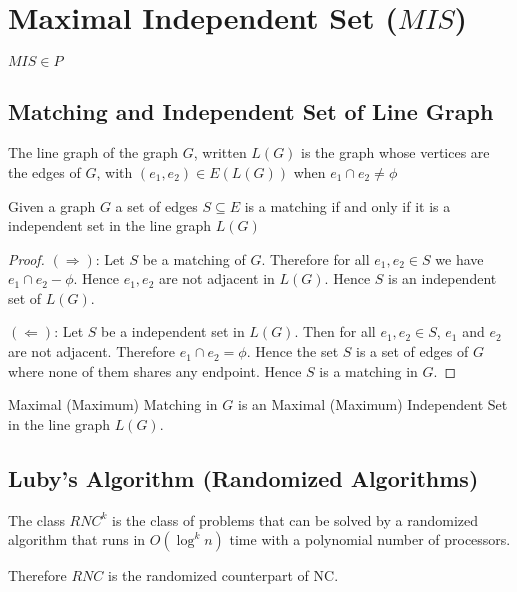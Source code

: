 \section{Maximal Independent Set ($MIS$)}
\begin{theorem}
	$MIS\in P$
\end{theorem}

\subsection{Matching and Independent Set of Line Graph}

\begin{definition}
	The line graph of the graph $G$, written $L(G)$  is the graph whose vertices are the edges of $G$, with $(e_1,e_2)\in E(L(G))$ when $e_1\cap e_2\neq \phi$
\end{definition}

\begin{theorem}
	Given a graph $G$ a set of edges $S\subseteq E$ is a matching if and only if it is a independent set in the line graph $L(G)$
\end{theorem}
\begin{proof}
	$(\Rightarrow)$: Let $S$ be a matching of $G$. Therefore for all $e_1,e_2\in S$ we have $e_1\cap e_2-\phi$. Hence $e_1,e_2$ are not adjacent in $L(G)$. Hence $S$ is an independent set of $L(G)$.
	
	$(\Leftarrow)$: Let $S$ be a independent set in $L(G)$. Then for all $e_1,e_2\in S$, $e_1$ and $e_2$ are not adjacent. Therefore $e_1\cap e_2=\phi$. Hence the set $S$ is a set of edges of $G$ where none of them shares any endpoint. Hence $S$ is a matching in $G$.
\end{proof}

\begin{fact}
	Maximal (Maximum) Matching in $G$ is an Maximal (Maximum) Independent Set  in the line graph $L(G)$.
\end{fact}

\subsection{Luby's Algorithm (Randomized Algorithms)}
\begin{definition}[$RNC^{k}$]
	The class $RNC^{k}$ is the class of problems that can be solved by a randomized algorithm that runs in $O(\log^k n)$ time with a polynomial number of processors. 
\end{definition}
\begin{remark}
	Therefore $RNC$ is the randomized counterpart of NC.\parinn
\end{remark}

